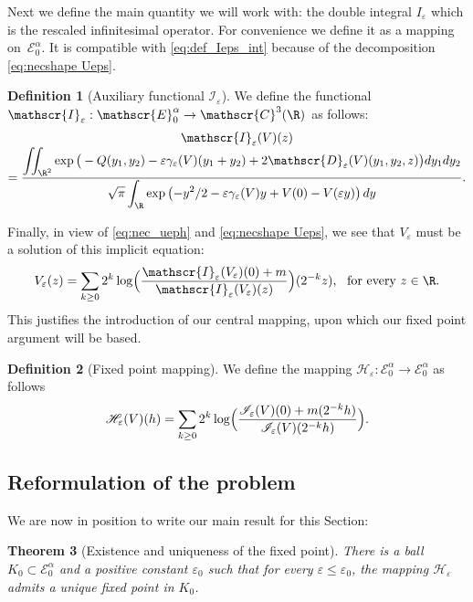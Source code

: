 \documentclass[JEP,XML,SOM,Unicode]{cedram}
\let\mathcal\mathscr
\newcommand{\cC}{\mathcal{C}}
\newcommand{\cI}{\mathcal{I}}
\theoremstyle{plain}
\newtheorem{thm}{Theorem}[section]
\theoremstyle{definition}
\newtheorem{definition}[thm]{Definition}
\renewcommand{\H}{\mathcal{H}_\eps}
\newcommand{\D}{\mathcal{D}_\eps}
\let\eps\varepsilon
\let\ds\displaystyle
\newcommand{\Eaz}{\mathcal{E}^\alpha_0}
\begin{document}
Next we define the main quantity we will work with: the double integral $I_\eps$ which is the rescaled infinitesimal operator. For convenience we define it as a mapping on~$\Eaz$. It is compatible with \eqref{eq:def_Ieps_int} because of the decomposition \eqref{eq:necshape Ueps}.
\begin{definition}[Auxiliary functional $\cI_\eps$]\label{def Ieps}
We define the functional $\cI_\eps: \Eaz \to \cC^3(\R)$ as follows:\vspace*{-3pt}
\begin{multline}\label{eq:def_Ieps}
\cI_\eps(V)(z)\\[-3pt]
= \dfrac{\ds \iint_{\R^2} \exp\big(-Q(y_1,y_2)-\eps \gamma_\eps(V)(y_1+y_2) +2\D(V)(y_1,y_2,z) \big)d y_1 d y_2 }
{\ds\sqrt{\pi } \int_\R \exp\left(- y^2/2 -\eps \gamma_\eps (V) y + V(0)- V(\eps y) \right) d y}.
\end{multline}
\end{definition}
Finally, in view of \eqref{eq:nec_ueph} and \eqref{eq:necshape Ueps}, we see that $V_\eps$ must be a solution of this implicit equation:\vspace*{-3pt}
\begin{equation}\label{eq:nec_Veps}
V_\eps (z) =\sum_{k\geq 0} 2^k \log \Bigl(\dfrac{\cI_\eps(V_\eps)(0)+ m}{\cI_\eps(V_\eps)(z)} \Bigr) (2^{-k}z), \ \hbox{ for every } z \in \R.
\end{equation}
This justifies the introduction of our central mapping, upon which our fixed point argument will be based.
\begin{definition}[Fixed point mapping]\label{def:H}
We define the mapping $\H: \Eaz \to \Eaz$ as follows\vspace*{-3pt}
\begin{equation}\label{eq:defH}
\H(V)(h) = \sum_{k \geq 0} 2^k \log \Bigl(\dfrac{\cI_\eps(V) (0)+ m(2^{-k} h)}{\cI_\eps(V) (2^{-k}h)} \Bigr).
\end{equation}
\end{definition}

\subsection{Reformulation of the problem}
We are now in position to write our main result for this Section:

\begin{thm}[Existence and uniqueness of the fixed point]\label{existunique fixedpoint}
There is a ball $K_0 \subset \Eaz$ and a positive constant $\eps_0$ such that for every $\eps\leq \eps_0$, the mapping $\H$ admits a unique fixed point in $K_0$.
\end{thm}
\end{document}

